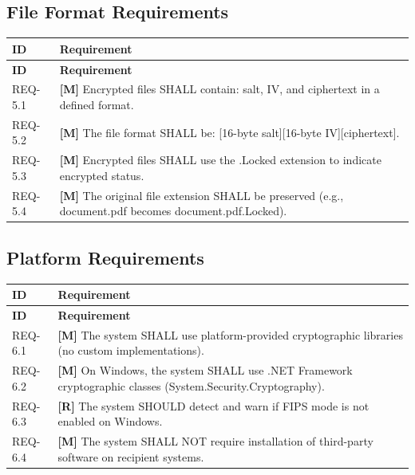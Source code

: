 \documentclass[11pt,letterpaper]{article}
\begin{document}
\subsection{File Format Requirements}

\begin{longtable}{@{}p{1.2cm}p{12cm}@{}}
\toprule
\textbf{ID} & \textbf{Requirement} \\
\midrule
\endfirsthead
\toprule
\textbf{ID} & \textbf{Requirement} \\
\midrule
\endhead

REQ-5.1 & \textcolor{mandatory}{\textbf{[M]}} Encrypted files SHALL contain: salt, IV, and ciphertext in a defined format. \\[6pt]

REQ-5.2 & \textcolor{mandatory}{\textbf{[M]}} The file format SHALL be: [16-byte salt][16-byte IV][ciphertext]. \\[6pt]

REQ-5.3 & \textcolor{mandatory}{\textbf{[M]}} Encrypted files SHALL use the .Locked extension to indicate encrypted status. \\[6pt]

REQ-5.4 & \textcolor{mandatory}{\textbf{[M]}} The original file extension SHALL be preserved (e.g., document.pdf becomes document.pdf.Locked). \\[6pt]

\bottomrule
\end{longtable}

\subsection{Platform Requirements}

\begin{longtable}{@{}p{1.2cm}p{12cm}@{}}
\toprule
\textbf{ID} & \textbf{Requirement} \\
\midrule
\endfirsthead
\toprule
\textbf{ID} & \textbf{Requirement} \\
\midrule
\endhead

REQ-6.1 & \textcolor{mandatory}{\textbf{[M]}} The system SHALL use platform-provided cryptographic libraries (no custom implementations). \\[6pt]

REQ-6.2 & \textcolor{mandatory}{\textbf{[M]}} On Windows, the system SHALL use .NET Framework cryptographic classes (System.Security.Cryptography). \\[6pt]

REQ-6.3 & \textcolor{recommended}{\textbf{[R]}} The system SHOULD detect and warn if FIPS mode is not enabled on Windows. \\[6pt]

REQ-6.4 & \textcolor{mandatory}{\textbf{[M]}} The system SHALL NOT require installation of third-party software on recipient systems. \\[6pt]

\bottomrule
\end{longtable}
\end{document}
